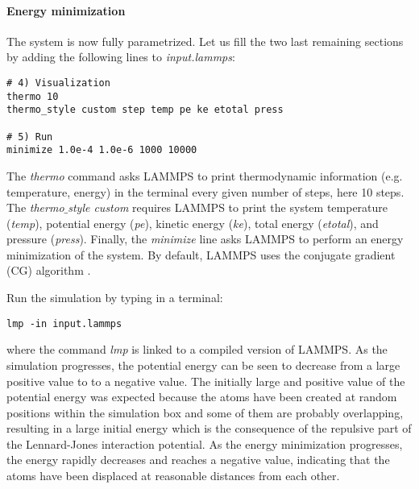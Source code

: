 \paragraph{Energy minimization}
The system is now fully parametrized. Let us fill the two last remaining sections by adding the following lines to \textit{input.lammps}:
\begin{verbatim}
# 4) Visualization
thermo 10
thermo_style custom step temp pe ke etotal press

# 5) Run
minimize 1.0e-4 1.0e-6 1000 10000
\end{verbatim}
The \textit{thermo} command asks LAMMPS to print thermodynamic information (e.g. temperature, energy) in the terminal every given number of steps, here 10 steps. The \textit{thermo$\_$style custom} requires LAMMPS to print the system temperature (\textit{temp}), potential energy (\textit{pe}), kinetic energy (\textit{ke}), total energy (\textit{etotal}), and pressure (\textit{press}). Finally, the \textit{minimize} line asks LAMMPS to perform an energy minimization of the system. By default, LAMMPS uses the conjugate gradient (CG) algorithm \cite{hestenes1952methods}.

Run the simulation by typing in a terminal:
\begin{verbatim}
lmp -in input.lammps
\end{verbatim}
where the command \textit{lmp} is linked to a compiled version of LAMMPS. As the simulation progresses, the potential energy can be seen to decrease from a large positive value to to a negative value. The initially large and positive value of the potential energy was expected because the atoms have been created at random positions within the simulation box and some of them are probably overlapping, resulting in a large initial energy which is the consequence of the repulsive part of the Lennard-Jones interaction potential. As the energy minimization progresses, the energy rapidly decreases and reaches a negative value, indicating that the atoms have been displaced at reasonable distances from each other.

